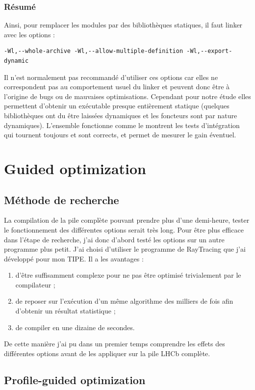 \documentclass[a4paper,11pt]{report}
\begin{document}
\subsubsection{Résumé}
Ainsi, pour remplacer les modules par des bibliothèques statiques, il faut linker avec les options :
\begin{verbatim}
-Wl,--whole-archive -Wl,--allow-multiple-definition -Wl,--export-dynamic
\end{verbatim}

Il n'est normalement pas recommandé d'utiliser ces options car elles ne correspondent pas au comportement usuel du linker et peuvent donc être à l'origine de bugs ou de mauvaises optimisations.
Cependant pour notre étude elles permettent d'obtenir un exécutable presque entièrement statique (quelques bibliothèques ont du être laissées dynamiques et les foncteurs sont par nature dynamiques).
L'ensemble fonctionne comme le montrent les tests d'intégration qui tournent toujours et sont corrects, et permet de mesurer le gain éventuel.

\section{Guided optimization}
\subsection{Méthode de recherche}
La compilation de la pile complète pouvant prendre plus d'une demi-heure, tester le fonctionnement des différentes options serait très long.
Pour être plus efficace dans l'étape de recherche, j'ai donc d'abord testé les options sur un autre programme plus petit.
J'ai choisi d'utiliser le programme de RayTracing que j'ai développé pour mon TIPE.
Il a les avantages :
\begin{enumerate}
    \item d'être suffisamment complexe pour ne pas être optimisé trivialement par le compilateur ;
    \item de reposer sur l'exécution d'un même algorithme des milliers de fois afin d'obtenir un résultat statistique ;
    \item de compiler en une dizaine de secondes.
\end{enumerate}
De cette manière j'ai pu dans un premier temps comprendre les effets des différentes options avant de les appliquer sur la pile LHCb complète.

\subsection{Profile-guided optimization}
\end{document}
